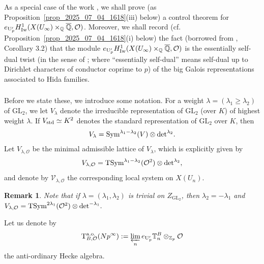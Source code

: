 \documentclass{amsart}
\numberwithin{equation}{section}
\newtheorem{remark}[theorem]{Remark}
\newcommand{\QQ}{\mathbb{Q}}
\newcommand{\ZZ}{\mathbb{Z}}
\newcommand{\GL}{\mathrm{GL}}
\newcommand{\TT}{\mathbb{T}}
\newcommand{\Q}{\QQ}
\begin{document}
\subsubsection{} As a special case of the work \cite{LRZ}, we shall prove (as Proposition~\ref{prop_2025_07_04_1618}(iii) below) a control theorem for $e_{{\rm U}_{p}'} H^1_{\rm Iw}( X(U_\infty)\times_{\QQ}  \overline{\Q}, \mathcal{O})$. Moreover, we shall record (cf. Proposition~\ref{prop_2025_07_04_1618}(i) below) the fact (borrowed from \cite{Fouquet2013}, Corollary 3.2) that the module $e_{{\rm U}_{p}'} H^1_{\rm Iw}( X(U_\infty)\times_{\QQ} \overline{\Q}, \mathcal{O})$ is the essentially self-dual twist (in the sense of \cite[Definition 2.1.3]{howard2007}; where ``essentially self-dual'' means self-dual up to Dirichlet characters of conductor coprime to $p$) of the big Galois representations associated to Hida families.  

\subsubsection{} Before we state these, we introduce some notation. For a weight $\lambda = (\lambda_1 \geq \lambda_2)$  of $\GL_2$, we let $V_\lambda$ denote the irreducible representation of $\GL_2$ (over $K$) of highest weight $\lambda$. If $V_{\rm std} \simeq K^2$ denotes the standard representation of $\GL_2$ over $K$, then $$V_\lambda  = {\rm Sym}^{\lambda_1 - \lambda_2} (V) \otimes {\rm det}^{\lambda_2}.$$
Let $V_{\lambda, \mathcal{O}}$ be the minimal admissible lattice of $V_\lambda$, which is explicitly given by 
$$ V_{\lambda, \mathcal{O}} =  {\rm TSym}^{\lambda_1 - \lambda_2} (\mathcal{O}^2) \otimes  {\rm det}^{\lambda_2},$$
and denote by $\mathscr{V}_{\lambda, \mathcal{O}}$ the corresponding local system on $X(U_n)$.


\begin{remark}
Note that if $\lambda = (\lambda_1,\lambda_2)$ is trivial on $Z_{\GL_2}$, then $\lambda_2 = - \lambda_1$ and $ V_{\lambda, \mathcal{O}} =  {\rm TSym}^{2 \lambda_1} (\mathcal{O}^2) \otimes  {\rm det}^{-\lambda_1}.$
\end{remark}


Let us denote by
$$ \mathrm{T}^{\rm a.o.}_{B,\mathcal{O}}(Np^\infty):= \varprojlim_n e_{{\rm U}_{p}'} \TT_n^B \otimes_{\ZZ_p} \mathcal{O}$$
the anti-ordinary Hecke algebra.
\end{document}
